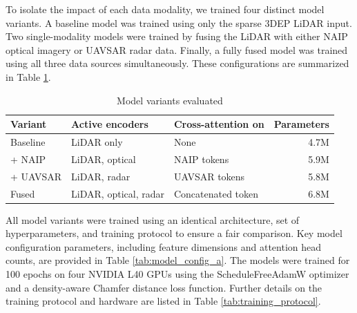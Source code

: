 \documentclass[preprints,article,accept,pdftex,moreauthors]{Definitions/mdpi}
\begin{document}
To isolate the impact of each data modality, we trained four distinct model variants. A baseline model was trained using only the sparse 3DEP LiDAR input. Two single-modality models were trained by fusing the LiDAR with either NAIP optical imagery or UAVSAR radar data. Finally, a fully fused model was trained using all three data sources simultaneously. These configurations are summarized in Table \ref{tab:model_variants}.
\begin{table}[htbp]
  \centering
  \caption{Model variants evaluated}
  \label{tab:model_variants}
  \begin{tabular}{lllr}
  \toprule
  \textbf{Variant} & \textbf{Active encoders} & \textbf{Cross-attention on} & \textbf{Parameters} \\
  \midrule
 Baseline & LiDAR only & None  & 4.7M \\
  + NAIP & LiDAR, optical  & NAIP tokens & 5.9M \\
  + UAVSAR & LiDAR, radar & UAVSAR tokens  & 5.8M \\
  Fused  & LiDAR, optical, radar & Concatenated token  & 6.8M \\
  \bottomrule
  \end{tabular}
\end{table}

All model variants were trained using an identical architecture, set of hyperparameters, and training protocol to ensure a fair comparison. Key model configuration parameters, including feature dimensions and attention head counts, are provided in Table \ref{tab:model_config_a}. The models were trained for 100 epochs on four NVIDIA L40 GPUs using the ScheduleFreeAdamW optimizer and a density-aware Chamfer distance loss function. Further details on the training protocol and hardware are listed in Table \ref{tab:training_protocol}.
\end{document}
